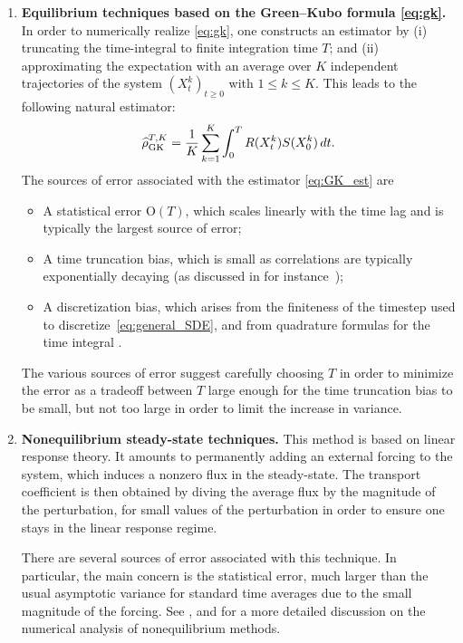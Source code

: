 \documentclass[11pt]{article}
\newcommand{\bigO}{\mathrm{O}}
\renewcommand{\geq}{\geqslant}
\renewcommand{\leq}{\leqslant}
\theoremstyle{definition}
\newcommand{\GKest}{\mathcal{\widehat{\rho}}^{T,K}_{\rm GK}}
\begin{document}
\begin{enumerate}
    \item {\bf Equilibrium techniques based on the Green--Kubo formula \eqref{eq:gk}.} In order to numerically realize \eqref{eq:gk}, one constructs an estimator by (i) truncating the time-integral to finite integration time $T$; and (ii) approximating the expectation with an average over $K$ independent trajectories of the system $(X_t^k)_{t\geq 0}$ with $1\leq k\leq K$. This leads to the following natural estimator:
    \begin{equation}
        \GKest = \frac{1}{K}\sum_{k=1}^K \int_0^T R(X_t^k)S(X_0^k) \, dt.
        \label{eq:GK_est}
    \end{equation}
The sources of error associated with the estimator \eqref{eq:GK_est} are

\begin{itemize}
    \item A statistical error $\bigO(T)$, which scales linearly with the time lag \cite{sousaoliveira2017,plechac2022,gastaldello2024} and is typically the largest source of error;
    \item A time truncation bias, which is small as correlations are typically exponentially decaying (as discussed in for instance~\cite{plechac2022});
    \item A discretization bias, which arises from the finiteness of the timestep used to discretize~\eqref{eq:general_SDE}, and from quadrature formulas for the time integral \cite{leimkuhler2016,lelievre2016}.
\end{itemize}
    
The various sources of error suggest carefully choosing $T$ in order to minimize the error as a tradeoff between $T$ large enough for the time truncation bias to be small, but not too large in order to limit the increase in variance.
    
    \item {\bf Nonequilibrium steady-state techniques.} This method is based on linear response theory. It amounts to permanently adding an external forcing to the system, which induces a nonzero flux in the steady-state. The transport coefficient is then obtained by diving the average flux by the magnitude of the perturbation, for small values of the perturbation in order to ensure one stays in the linear response regime.
       
   There are several sources of error associated with this technique. In particular, the main concern is the statistical error, much larger than the usual asymptotic variance for standard time averages due to the small magnitude of the forcing. See \cite[Section 5]{lelievre2016}, \cite[Section 2]{spacek2023} and \cite[Section 3]{leimkuhler2016} for a more detailed discussion on the numerical analysis of nonequilibrium methods.
   

\end{enumerate}
\end{document}
